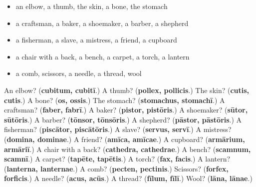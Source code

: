 \begin{itemize}
\raggedright
  \item an elbow, a thumb, the skin, a bone, the stomach
  \item a craftsman, a baker, a shoemaker, a barber, a shepherd
  \item a fisherman, a slave, a mistress, a friend, a cupboard
  \item a chair with a back, a bench, a carpet, a torch, a lantern
  \item a comb, scissors, a needle, a thread, wool
\end{itemize}

\begin{tcolorbox}[breakable,colback=teal!4,colframe=teal!35!black,title={Before you move on}]
An elbow? (\textbf{cubitum, cubitī}.) A thumb? (\textbf{pollex, pollicis}.) The skin? (\textbf{cutis, cutis}.) A bone? (\textbf{os, ossis}.) The stomach? (\textbf{stomachus, stomachī}.) A craftsman? (\textbf{faber, fabrī}.) A baker? (\textbf{pistor, pistōris}.) A shoemaker? (\textbf{sūtor, sūtōris}.) A barber? (\textbf{tōnsor, tōnsōris}.) A shepherd? (\textbf{pāstor, pāstōris}.) A fisherman? (\textbf{piscātor, piscātōris}.) A slave? (\textbf{servus, servī}.) A mistress? (\textbf{domina, dominae}.) A friend? (\textbf{amīca, amīcae}.) A cupboard? (\textbf{armārium, armāriī}.) A chair with a back? (\textbf{cathedra, cathedrae}.) A bench? (\textbf{scamnum, scamnī}.) A carpet? (\textbf{tapēte, tapētis}.) A torch? (\textbf{fax, facis}.) A lantern? (\textbf{lanterna, lanternae}.) A comb? (\textbf{pecten, pectinis}.) Scissors? (\textbf{forfex, forficis}.) A needle? (\textbf{acus, acūs}.) A thread? (\textbf{fīlum, fīlī}.) Wool? (\textbf{lāna, lānae}.)
\end{tcolorbox}
